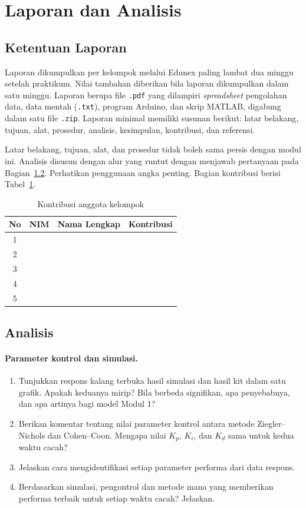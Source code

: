 \documentclass[11pt,a4paper]{article}
\begin{document}
\section{Laporan dan Analisis}
\subsection{Ketentuan Laporan}
Laporan dikumpulkan per kelompok melalui Edunex paling lambat dua minggu setelah praktikum. Nilai tambahan diberikan bila laporan dikumpulkan dalam satu minggu. Laporan berupa file \texttt{.pdf} yang dilampiri \textit{spreadsheet} pengolahan data, data mentah (\texttt{.txt}), program Arduino, dan skrip MATLAB, digabung dalam satu file \texttt{.zip}. Laporan minimal memiliki susunan berikut: latar belakang, tujuan, alat, prosedur, analisis, kesimpulan, kontribusi, dan referensi.

Latar belakang, tujuan, alat, dan prosedur tidak boleh sama persis dengan modul ini. Analisis disusun dengan alur yang runtut dengan menjawab pertanyaan pada Bagian~\ref{sec:analisis}. Perhatikan penggunaan angka penting. Bagian kontribusi berisi Tabel~\ref{tab:kontribusi}.

\begin{table}[H]
\centering
\caption{Kontribusi anggota kelompok}
\label{tab:kontribusi}
\begin{tabularx}{\textwidth}{|c|c|l|X|}
\hline
\textbf{No} & \textbf{NIM} & \textbf{Nama Lengkap} & \textbf{Kontribusi} \\
\hline
1 & & & \\
2 & & & \\
3 & & & \\
4 & & & \\
5 & & & \\
\hline
\end{tabularx}
\end{table}

\subsection{Analisis}
\label{sec:analisis}

\paragraph{Parameter kontrol dan simulasi.}
\begin{enumerate}
\item Tunjukkan respons kalang terbuka hasil simulasi dan hasil kit dalam satu grafik. Apakah keduanya mirip? Bila berbeda signifikan, apa penyebabnya, dan apa artinya bagi model Modul 1?
\item Berikan komentar tentang nilai parameter kontrol antara metode Ziegler--Nichols dan Cohen--Coon. Mengapa nilai $K_p$, $K_i$, dan $K_d$ sama untuk kedua waktu cacah?
\item Jelaskan cara mengidentifikasi setiap parameter performa dari data respons.
\item Berdasarkan simulasi, pengontrol dan metode mana yang memberikan performa terbaik untuk setiap waktu cacah? Jelaskan.
\end{enumerate}
\end{document}
